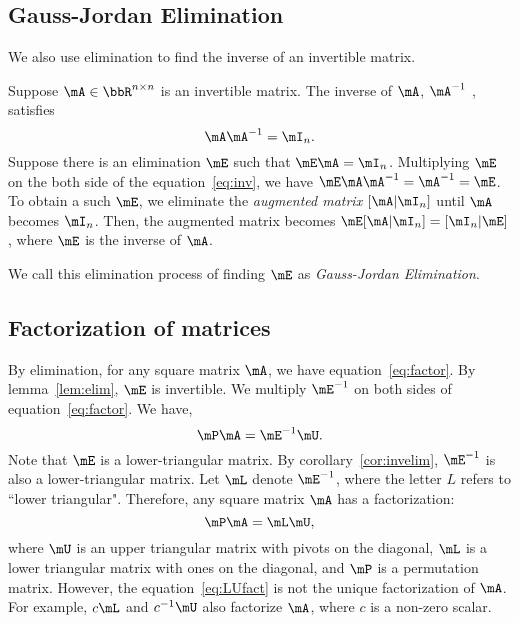 \documentclass[11pt]{article}
\theoremstyle{plain}
\theoremstyle{definition}
\begin{document}
\subsection{Gauss-Jordan Elimination}
We also use elimination to find the inverse of an invertible matrix.

\vspace{0.2cm}
 Suppose $\mA \in \bbR^{n \times n}$ is an invertible matrix. The inverse of $\mA$, $\mA^{-1}$ , satisfies 
 \begin{equation}\label{eq:inv}
 	\mA \mA^{-1} = \mI_n.
 \end{equation}
 Suppose there is an elimination $\mE$ such that $\mE \mA = \mI_n$. Multiplying $\mE$ on the both side of the equation~\eqref{eq:inv}, we have $\mE  \mA \mA^{-1}= \mA^{-1} = \mE$. To obtain a such $\mE$, we eliminate the \textit{augmented matrix} $[\mA|\mI_n]$ until $\mA$ becomes $\mI_n$. Then, the augmented matrix becomes $\mE[\mA|\mI_n] = [\mI_n|\mE]$, where $\mE$ is the inverse of $\mA$.
 
 \vspace{0.2cm}
We call this elimination process of finding $\mE$ as \textit{Gauss-Jordan Elimination}.



\subsection{Factorization of matrices}
By elimination, for any square matrix $\mA$, we have equation~\eqref{eq:factor}.
 By lemma~\ref{lem:elim}, $\mE$ is invertible. We multiply $\mE^{-1}$ on both sides of equation~\eqref{eq:factor}. We have, 
\[ \mP \mA = \mE^{-1} \mU. \]
 Note that $\mE$ is a lower-triangular matrix. By corollary~\ref{cor:invelim}, $\mE^{-1}$ is also a lower-triangular matrix. Let $\mL$ denote $\mE^{-1}$, where the letter $L$ refers to ``lower triangular". Therefore, any square matrix $\mA$ has a factorization:
\begin{equation}\label{eq:LUfact}
	\mP \mA = \mL \mU,
\end{equation}
where $\mU$ is an upper triangular matrix with pivots on the diagonal, $\mL$ is a lower triangular matrix with ones on the diagonal, and $\mP$ is a permutation matrix. However, the equation~\eqref{eq:LUfact} is not the unique factorization of $\mA$. For example, $c\mL$ and $c^{-1}\mU$ also factorize $\mA$, where $c$ is a non-zero scalar.
\end{document}
